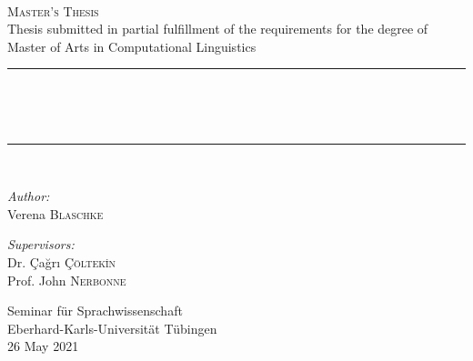 \begin{titlepage}
\begin{center}

~\\\vspace{2em}
\textsc{\LARGE Master's Thesis}\\[0.8cm]

{\large Thesis submitted in partial fulfillment of the requirements for the degree of Master of Arts in Computational Linguistics}\\[0.5cm]

\vspace{2em}

\rule{\linewidth}{0.5mm}\\[0.4cm]


\vspace{2em}



\\
\vspace{0.4em}

\rule{\linewidth}{0.5mm} \\[1.5cm]



\begin{minipage}{0.4\textwidth}
\begin{flushleft} \large
\emph{Author:}\\
Verena \textsc{Blaschke}
\end{flushleft}
\end{minipage}
\begin{minipage}{0.5\textwidth}
\begin{flushright} \large
\emph{Supervisors:} \\
Dr. Çağrı \textsc{Çöltek\.{\.i}n} \\
Prof. John \textsc{Nerbonne}\\
\end{flushright}
\end{minipage}


\vfill



{\large Seminar f\"ur Sprachwissenschaft\\Eberhard-Karls-Universit\"at T\"ubingen}\\[1.5cm]



{\large 26 May 2021}

\end{center}
\end{titlepage}